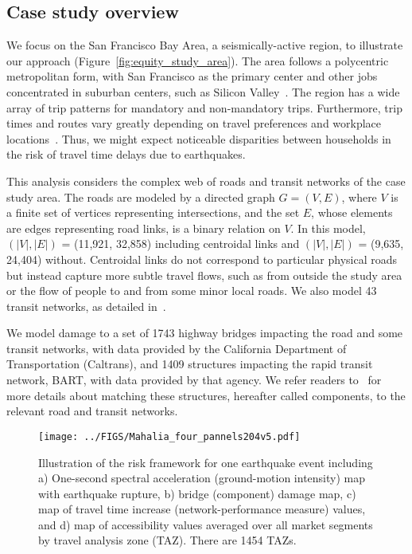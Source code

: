 \subsection{Case study overview}
We focus on the San Francisco Bay Area, a seismically-active region, to illustrate our approach (Figure~\ref{fig:equity_study_area}). The area follows a polycentric metropolitan form, with San Francisco as the primary center and other jobs  concentrated in suburban centers, such as Silicon Valley~\cite{cervero_polycentrism_1997}. The region has a wide array of trip patterns for mandatory and non-mandatory trips. Furthermore, trip times and routes vary greatly depending on travel preferences and workplace locations~\cite{cervero_polycentrism_1997}. Thus,  we might expect noticeable disparities between households in the risk of travel time delays due to earthquakes. 

This analysis considers the complex web of roads and transit networks of the case study area. The roads are modeled by a directed graph $G = (V, E)$, where $V$ is a finite set of vertices representing intersections, and the set $E$, whose elements are edges representing road links, is a binary relation on $V$. In this model, $(|V|, |E|)$ = (11,921, 32,858) including centroidal links and $(|V|, |E|)$ = (9,635, 24,404) without. Centroidal links do not correspond to particular physical roads but instead capture more subtle travel flows, such as  from outside the study area or the flow of people to and from some minor local roads. We also model 43 transit networks, as detailed in~\cite{miller_seismic_2014}.

We  model damage to a set of 1743 highway bridges impacting the road and some transit networks, with data provided by the California Department of Transportation (Caltrans), and 1409 structures impacting the rapid transit network, BART, with data provided by that agency. We refer readers to~\cite{miller_seismic_2014} for more details about matching these structures, hereafter called components, to the relevant road and transit networks.


\begin{sidewaysfigure}
\centering
\texttt{[image: ../FIGS/Mahalia\_four\_pannels204v5.pdf]} %
\caption{Illustration of the risk framework for one earthquake event including a) One-second spectral acceleration  (ground-motion intensity) map with earthquake rupture, b) bridge (component) damage map, c) map of travel time increase (network-performance measure) values, and d) map of accessibility values averaged over all market segments by travel analysis zone (TAZ). There are 1454 TAZs.}
\label{fig:four_steps}\end{sidewaysfigure}

